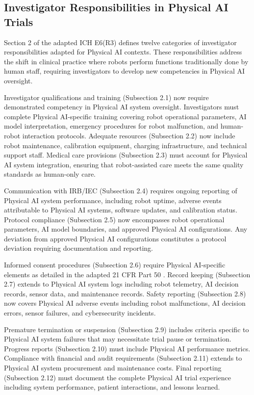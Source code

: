 \subsection{Investigator Responsibilities in Physical AI Trials}
\label{subsec:ich-investigator}

Section 2 of the adapted ICH E6(R3) defines twelve categories of investigator
responsibilities adapted for Physical AI contexts. These responsibilities
address the shift in clinical practice where robots perform functions
traditionally done by human staff, requiring investigators to develop new
competencies in Physical AI oversight.

Investigator qualifications and training (Subsection 2.1) now require
demonstrated competency in Physical AI system oversight. Investigators must
complete Physical AI-specific training covering robot operational parameters,
AI model interpretation, emergency procedures for robot malfunction, and
human-robot interaction protocols. Adequate resources (Subsection 2.2) now
include robot maintenance, calibration equipment, charging infrastructure, and
technical support staff. Medical care provisions (Subsection 2.3) must account
for Physical AI system integration, ensuring that robot-assisted care meets the
same quality standards as human-only care.

Communication with IRB/IEC (Subsection 2.4) requires ongoing reporting of
Physical AI system performance, including robot uptime, adverse events
attributable to Physical AI systems, software updates, and calibration status.
Protocol compliance (Subsection 2.5) now encompasses robot operational
parameters, AI model boundaries, and approved Physical AI configurations. Any
deviation from approved Physical AI configurations constitutes a protocol
deviation requiring documentation and reporting.

Informed consent procedures (Subsection 2.6) require Physical AI-specific
elements as detailed in the adapted 21 CFR Part 50 \cite{cfr50-adapt}. Record
keeping (Subsection 2.7) extends to Physical AI system logs including robot
telemetry, AI decision records, sensor data, and maintenance records. Safety
reporting (Subsection 2.8) now covers Physical AI adverse events including
robot malfunctions, AI decision errors, sensor failures, and cybersecurity
incidents.

Premature termination or suspension (Subsection 2.9) includes criteria specific
to Physical AI system failures that may necessitate trial pause or termination.
Progress reports (Subsection 2.10) must include Physical AI performance metrics.
Compliance with financial and audit requirements (Subsection 2.11) extends to
Physical AI system procurement and maintenance costs. Final reporting
(Subsection 2.12) must document the complete Physical AI trial experience
including system performance, patient interactions, and lessons learned.

